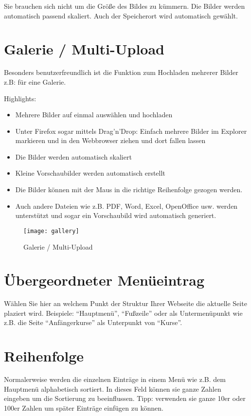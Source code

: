 \documentclass[article, a4paper, oneside, 11pt]{memoir}
\begin{document}
Sie brauchen sich nicht um die Größe des Bildes zu kümmern. Die Bilder werden automatisch passend skaliert.
Auch der Speicherort wird automatisch gewählt.

\section{Galerie / Multi-Upload}
\label{sec:gallery}

Besonders benutzerfreundlich ist die Funktion zum Hochladen mehrerer Bilder z.B: für eine Galerie.

Highlights:
\begin{itemize}
\item Mehrere Bilder auf einmal auswählen und hochladen
\item Unter Firefox sogar mittels Drag'n'Drop: Einfach mehrere Bilder im Explorer markieren und in den Webbrowser ziehen und dort fallen lassen
\item Die Bilder werden automatisch skaliert
\item Kleine Vorschaubilder werden automatisch erstellt
\item Die Bilder können mit der Maus in die richtige Reihenfolge gezogen werden.
\item Auch andere Dateien wie z.B. PDF, Word, Excel, OpenOffice usw. werden unterstützt und sogar ein Vorschaubild wird automatisch generiert.
\end{itemize}


\begin{figure}[htp]
\centering
\texttt{[image: gallery]}
\caption{Galerie / Multi-Upload}
\label{fig:gallery}
\end{figure}






\section{Übergeordneter Menüeintrag}

Wählen Sie hier an welchem Punkt der Struktur Ihrer Webseite die aktuelle Seite plaziert wird. Beispiele: "`Hauptmenü"', "`Fußzeile"' oder als Untermenüpunkt wie z.B. die Seite "`Anfängerkurse"' als Unterpunkt von "`Kurse"'.

\section{Reihenfolge}

Normalerweise werden die einzelnen Einträge in einem Menü wie z.B. dem Hauptmenü alphabetisch sortiert. In dieses Feld können sie ganze Zahlen eingeben um die Sortierung zu beeinflussen. Tipp: verwenden sie ganze 10er oder 100er Zahlen um später Einträge einfügen zu können. 
\end{document}
